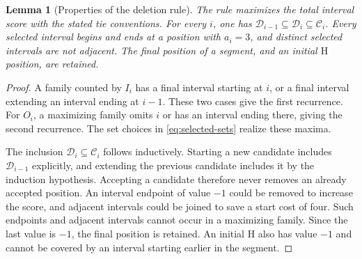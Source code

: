 \documentclass[11pt,a4paper]{article}
\newtheorem{lemma}[theorem]{Lemma}
\theoremstyle{definition}
\theoremstyle{remark}
\newcommand{\HH}{\mathrm H}
\begin{document}
\begin{lemma}[Properties of the deletion rule]\label{lem:selection}
The rule maximizes the total interval score with the stated tie conventions. For every $i$, one has $\mathcal D_{i-1}\subseteq\mathcal D_i\subseteq\mathcal C_i$. Every selected interval begins and ends at a position with $a_i=3$, and distinct selected intervals are not adjacent. The final position of a segment, and an initial $\HH$ position, are retained.
\end{lemma}
\begin{proof}
A family counted by $I_i$ has a final interval starting at $i$, or a final interval extending an interval ending at $i-1$. These two cases give the first recurrence. For $O_i$, a maximizing family omits $i$ or has an interval ending there, giving the second recurrence. The set choices in \eqref{eq:selected-sets} realize these maxima.

The inclusion $\mathcal D_i\subseteq\mathcal C_i$ follows inductively. Starting a new candidate includes $\mathcal D_{i-1}$ explicitly, and extending the previous candidate includes it by the induction hypothesis. Accepting a candidate therefore never removes an already accepted position. An interval endpoint of value $-1$ could be removed to increase the score, and adjacent intervals could be joined to save a start cost of four. Such endpoints and adjacent intervals cannot occur in a maximizing family. Since the last value is $-1$, the final position is retained. An initial $\HH$ also has value $-1$ and cannot be covered by an interval starting earlier in the segment.
\end{proof}
\end{document}
